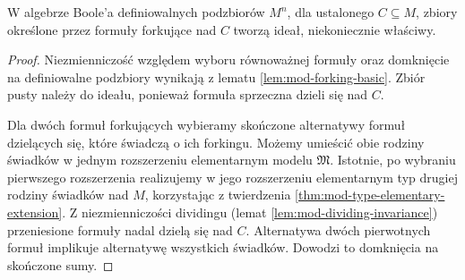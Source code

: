 \begin{lemat}
\label{lem:mod-forking-ideal}
W algebrze Boole'a definiowalnych podzbiorów
$M^n$, dla ustalonego $C\subseteq M$, zbiory
określone przez formuły forkujące nad $C$
tworzą ideał, niekoniecznie właściwy.
\end{lemat}
\begin{proof}
Niezmienniczość względem wyboru równoważnej
formuły oraz domknięcie na definiowalne
podzbiory wynikają z lematu
\ref{lem:mod-forking-basic}.
Zbiór pusty należy do ideału, ponieważ
formuła sprzeczna dzieli się nad $C$.

Dla dwóch formuł forkujących wybieramy
skończone alternatywy formuł dzielących się,
które świadczą o ich forkingu.
Możemy umieścić obie rodziny świadków
w jednym rozszerzeniu elementarnym
modelu $\mathfrak M$. Istotnie, po wybraniu
pierwszego rozszerzenia realizujemy w jego
rozszerzeniu elementarnym typ drugiej
rodziny świadków nad $M$, korzystając
z twierdzenia \ref{thm:mod-type-elementary-extension}.
Z niezmienniczości dividingu
(lemat \ref{lem:mod-dividing-invariance})
przeniesione formuły nadal dzielą się nad $C$.
Alternatywa dwóch pierwotnych formuł
implikuje alternatywę wszystkich świadków. Dowodzi to domknięcia
na skończone sumy.
\end{proof}

